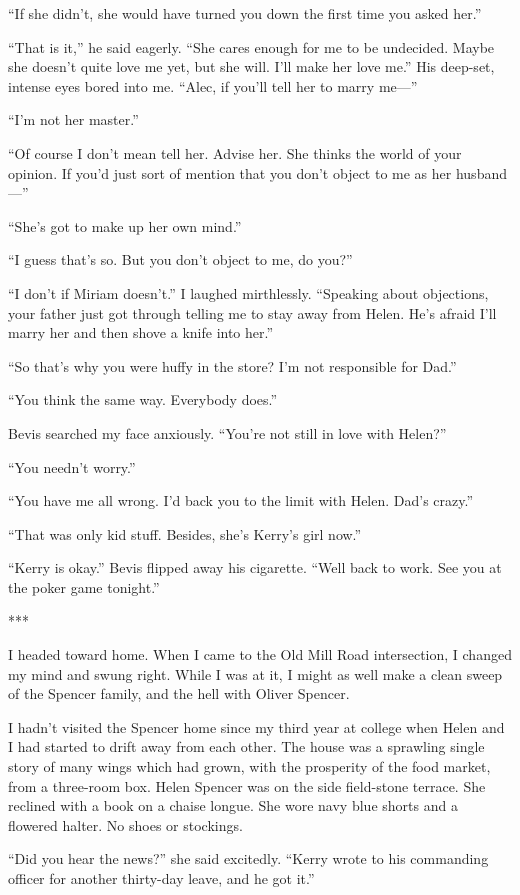 {“If she didn’t, she would have turned you down the first time you asked her.”

“That is it,” he said eagerly. “She cares enough for me to be undecided. Maybe she doesn’t quite love me yet, but she will. I’ll make her love me.” His deep-set, intense eyes bored into me. “Alec, if you’ll tell her to marry me—”

“I’m not her master.”

“Of course I don’t mean tell her. Advise her. She thinks the world of your opinion. If you’d just sort of mention that you don’t object to me as her husband—”

“She’s got to make up her own mind.”

“I guess that’s so. But you don’t object to me, do you?”

“I don’t if Miriam doesn’t.” I laughed mirthlessly. “Speaking about objections, your father just got through telling me to stay away from Helen. He’s afraid I’ll marry her and then shove a knife into her.”

“So that’s why you were huffy in the store? I’m not responsible for Dad.”

“You think the same way. Everybody does.”

Bevis searched my face anxiously. “You’re not still in love with Helen?”

“You needn’t worry.”

“You have me all wrong. I’d back you to the limit with Helen. Dad’s crazy.”

“That was only kid stuff. Besides, she’s Kerry’s girl now.”

“Kerry is okay.” Bevis flipped away his cigarette. “Well back to work. See you at the poker game tonight.”

***

I headed toward home. When I came to the Old Mill Road intersection, I changed my mind and swung right. While I was at it, I might as well make a clean sweep of the Spencer family, and the hell with Oliver Spencer.

I hadn’t visited the Spencer home since my third year at college when Helen and I had started to drift away from each other. The house was a sprawling single story of many wings which had grown, with the prosperity of the food market, from a three-room box. Helen Spencer was on the side field-stone terrace. She reclined with a book on a chaise longue. She wore navy blue shorts and a flowered halter. No shoes or stockings.

“Did you hear the news?” she said excitedly. “Kerry wrote to his commanding officer for another thirty-day leave, and he got it.”

}
